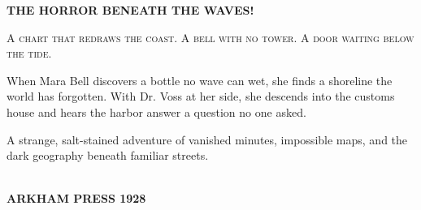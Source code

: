 \thispagestyle{empty}
\pagecolor{DeepSea}
\color{OldPaper}
\vspace*{12mm}
\begin{center}
  {\Huge\bfseries THE HORROR BENEATH THE WAVES!\par}
  \vspace{1em}
  {\Large\scshape A chart that redraws the coast. A bell with no tower.
  A door waiting below the tide.\par}
  \vspace{2em}
\end{center}
\noindent When Mara Bell discovers a bottle no wave can wet, she finds a
shoreline the world has forgotten. With Dr. Voss at her side, she descends
into the customs house and hears the harbor answer a question no one asked.

\medskip
\noindent A strange, salt-stained adventure of vanished minutes, impossible
maps, and the dark geography beneath familiar streets.

\vfill
\begin{center}
  \PulpBarcode\\[1em]
  {\sffamily\bfseries ARKHAM PRESS \textbullet{} 1928}
\end{center}
\clearpage
\pagecolor{white}
\color{Ink}

